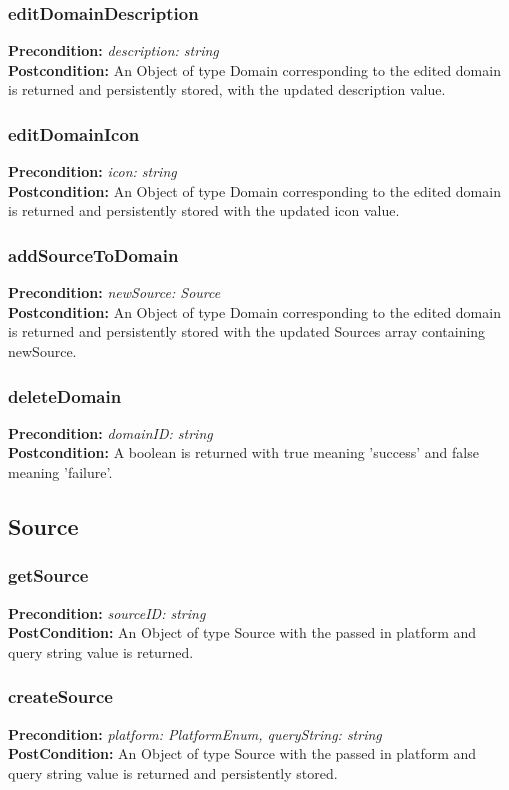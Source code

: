 \documentclass[12pt]{article}
\begin{document}
\subsubsection*{editDomainDescription}
\textbf{Precondition:} \textit{description: string} \\
\textbf{Postcondition:} An Object of type Domain corresponding to the edited domain is returned and persistently stored, with the updated description value.

\subsubsection*{editDomainIcon}
\textbf{Precondition:} \textit{icon: string} \\
\textbf{Postcondition:} An Object of type Domain corresponding to the edited domain is returned and persistently stored with the updated icon value.

\subsubsection*{addSourceToDomain}
\textbf{Precondition:} \textit{newSource: Source} \\
\textbf{Postcondition:} An Object of type Domain corresponding to the edited domain is returned and persistently stored with the updated Sources array containing newSource.

\subsubsection*{deleteDomain}
\textbf{Precondition:} \textit{domainID: string} \\
\textbf{Postcondition:} A boolean is returned with true meaning 'success' and false meaning 'failure'.

\subsection{Source}

\subsubsection*{getSource}
\textbf{Precondition:} \textit{sourceID: string} \\
\textbf{PostCondition:} An Object of type Source with the passed in platform and query string value is returned.

\subsubsection*{createSource}
\textbf{Precondition:} \textit{platform: PlatformEnum, queryString: string} \\
\textbf{PostCondition:} An Object of type Source with the passed in platform and query string value is returned and persistently stored.
\end{document}
